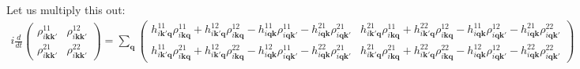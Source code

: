 \documentclass[a4paper]{article}
\begin{document}
Let us multiply this out:
\begin{eqnarray*}
  i \frac{d}{dt}
  \begin{pmatrix}
    \rho_{i\mathbf{kk'}}^{11} &
    \rho_{i\mathbf{kk'}}^{12} \\
    \rho_{i\mathbf{kk'}}^{21} &
    \rho_{i\mathbf{kk'}}^{22}
  \end{pmatrix}
  =
  \sum_{\mathbf{q}}^{}
  \begin{pmatrix}
    h_{i\mathbf{k'q}}^{11} \rho_{i\mathbf{kq}}^{11}
    + h_{i\mathbf{k'q}}^{12} \rho_{i\mathbf{kq}}^{12}
    -h_{i\mathbf{qk}}^{11} \rho_{i\mathbf{qk'}}^{11}
    -h_{i\mathbf{qk}}^{21} \rho_{i\mathbf{qk'}}^{21}
    &
    h_{i\mathbf{k'q}}^{21} \rho_{i\mathbf{kq}}^{11}
    + h_{i\mathbf{k'q}}^{22} \rho_{i\mathbf{kq}}^{12}
    -h_{i\mathbf{qk}}^{11} \rho_{i\mathbf{qk'}}^{12}
    -h_{i\mathbf{qk}}^{21} \rho_{i\mathbf{qk'}}^{22}
    \\
    h_{i\mathbf{k'q}}^{11} \rho_{i\mathbf{kq}}^{21}
    + h_{i\mathbf{k'q}}^{12} \rho_{i\mathbf{kq}}^{22}
    -h_{i\mathbf{qk}}^{12} \rho_{i\mathbf{qk'}}^{11}
    -h_{i\mathbf{qk}}^{22} \rho_{i\mathbf{qk'}}^{21}
    &
    h_{i\mathbf{k'q}}^{21} \rho_{i\mathbf{kq}}^{21}
    + h_{i\mathbf{k'q}}^{22} \rho_{i\mathbf{kq}}^{22}
    -h_{i\mathbf{qk}}^{12} \rho_{i\mathbf{qk'}}^{12}
    -h_{i\mathbf{qk}}^{22} \rho_{i\mathbf{qk'}}^{22}
  \end{pmatrix}
\end{eqnarray*}
\end{document}
